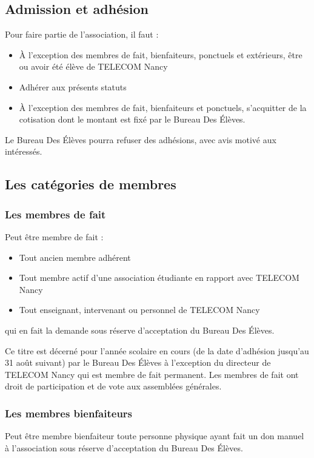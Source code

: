 \documentclass{article} %
\begin{document}
		\subsection{Admission et adhésion}
			Pour faire partie de l'association, il faut :
			\begin{itemize}
				\item À l’exception des membres de fait, bienfaiteurs, ponctuels et extérieurs,
					être ou avoir été élève de TELECOM Nancy
				\item Adhérer aux présents statuts
				\item À l’exception des membres de fait, bienfaiteurs et ponctuels,
					s'acquitter de la cotisation dont le montant est fixé par le Bureau Des Élèves.
			\end{itemize}

			Le Bureau Des Élèves pourra refuser des adhésions, avec avis motivé aux intéressés.

		\subsection{Les catégories de membres}
			\subsubsection{Les membres de fait}
				Peut être membre de fait :
				\begin{itemize}
					\item Tout ancien membre adhérent
					\item Tout membre actif d’une association étudiante en rapport avec TELECOM Nancy
					\item Tout enseignant, intervenant ou personnel de TELECOM Nancy
				\end{itemize}

				qui en fait la demande sous réserve d’acceptation du Bureau Des Élèves.

				Ce titre est décerné pour l’année scolaire en cours (de la date d’adhésion jusqu’au 31 août suivant)
				par le Bureau Des Élèves à l’exception du directeur de TELECOM Nancy qui est membre de fait permanent.
				Les membres de fait ont droit de participation et de vote aux assemblées générales.

			\subsubsection{Les membres bienfaiteurs}
				Peut être membre bienfaiteur toute personne physique ayant fait un don manuel à
				l’association sous réserve d’acceptation du Bureau Des Élèves.
\end{document}
